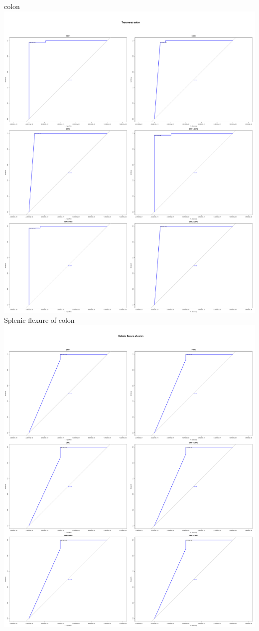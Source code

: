 \documentclass[openany]{book}
\begin{document}
colon\includegraphics{book1_files/figure-latex/plots-9.pdf} Splenic
flexure of colon\includegraphics{book1_files/figure-latex/plots-10.pdf}
\end{document}

